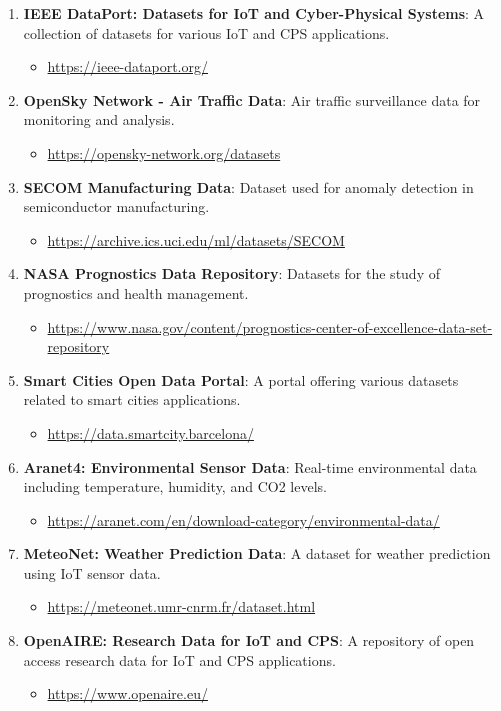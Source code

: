 \documentclass{article}
\begin{document}
\begin{enumerate}
    \item \textbf{IEEE DataPort: Datasets for IoT and Cyber-Physical Systems}: A collection of datasets for various IoT and CPS applications.
    \begin{itemize}
        \item \url{https://ieee-dataport.org/}
    \end{itemize}

    \item \textbf{OpenSky Network - Air Traffic Data}: Air traffic surveillance data for monitoring and analysis.
    \begin{itemize}
        \item \url{https://opensky-network.org/datasets}
    \end{itemize}

    \item \textbf{SECOM Manufacturing Data}: Dataset used for anomaly detection in semiconductor manufacturing.
    \begin{itemize}
        \item \url{https://archive.ics.uci.edu/ml/datasets/SECOM}
    \end{itemize}

    \item \textbf{NASA Prognostics Data Repository}: Datasets for the study of prognostics and health management.
    \begin{itemize}
        \item \url{https://www.nasa.gov/content/prognostics-center-of-excellence-data-set-repository}
    \end{itemize}

    \item \textbf{Smart Cities Open Data Portal}: A portal offering various datasets related to smart cities applications.
    \begin{itemize}
        \item \url{https://data.smartcity.barcelona/}
    \end{itemize}

    \item \textbf{Aranet4: Environmental Sensor Data}: Real-time environmental data including temperature, humidity, and CO2 levels.
    \begin{itemize}
        \item \url{https://aranet.com/en/download-category/environmental-data/}
    \end{itemize}

    \item \textbf{MeteoNet: Weather Prediction Data}: A dataset for weather prediction using IoT sensor data.
    \begin{itemize}
        \item \url{https://meteonet.umr-cnrm.fr/dataset.html}
    \end{itemize}

    \item \textbf{OpenAIRE: Research Data for IoT and CPS}: A repository of open access research data for IoT and CPS applications.
    \begin{itemize}
        \item \url{https://www.openaire.eu/}
    \end{itemize}
\end{enumerate}
\end{document}
